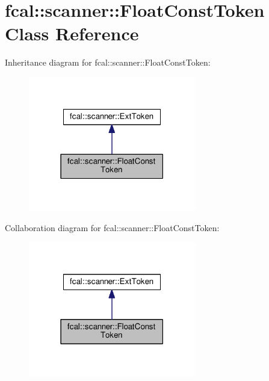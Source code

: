 \hypertarget{classfcal_1_1scanner_1_1FloatConstToken}{}\section{fcal\+:\+:scanner\+:\+:Float\+Const\+Token Class Reference}
\label{classfcal_1_1scanner_1_1FloatConstToken}


Inheritance diagram for fcal\+:\+:scanner\+:\+:Float\+Const\+Token\+:
\nopagebreak
\begin{figure}[H]
\begin{center}
\leavevmode
\includegraphics[width=207pt]{classfcal_1_1scanner_1_1FloatConstToken__inherit__graph}
\end{center}
\end{figure}


Collaboration diagram for fcal\+:\+:scanner\+:\+:Float\+Const\+Token\+:
\nopagebreak
\begin{figure}[H]
\begin{center}
\leavevmode
\includegraphics[width=207pt]{classfcal_1_1scanner_1_1FloatConstToken__coll__graph}
\end{center}
\end{figure}
